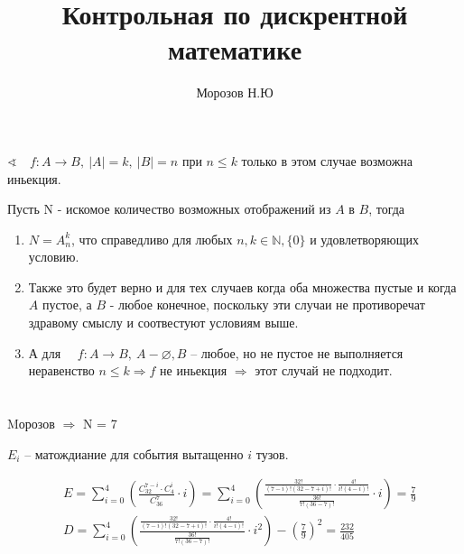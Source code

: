 

\begin{titlepage}
    \title{Контрольная по дискрентной математике}
    \author{Морозов Н.Ю}
    \date{}
\end{titlepage}



    \maketitle  
        
    \section{}

    $ \sphericalangle \quad f : A \longrightarrow B,\ |A| = k,\ |B| = n$ при $ n \leqslant  k $ только в этом случае возможна иньекция. 

    \noindent Пусть N - искомое количество возможных отображений из $A$ в $B$, тогда

    \begin{enumerate}
        \item $N = A^k_n$, что справедливо для любых $n, k \in \mathbb{N}, \{0\} $ и удовлетворяющих условию.
        \item Также это будет верно и для тех случаев когда оба множества пустые и когда $A$ пустое, а $B$ - любое
        конечное, поскольку эти случаи не противоречат здравому смыслу и соотвестуют условиям выше.
        \item А для $ \quad f : A \longrightarrow B, \ A - \varnothing, B$ -- любое, но не пустое не выполняется неравенство 
        $ n \leqslant  k \Longrightarrow f$ не иньекция $\Longrightarrow$ этот случай не подходит.
    \end{enumerate}

    \section{}

    Mорозов $ \Longrightarrow $ N = 7

   \noindent $E_i$ -- матождиание для события вытащенно $i$ тузов.

   

    \begin{align}
        &E = \sum_{i = 0}^{4} \left(\frac{C^{7-i}_{32} \cdot C^{i}_{4}}{C^7_{36}} \cdot i \right)  =
        \sum_{i=0}^{4} \left( \frac{\frac{32!}{(7-i)!(32-7+i)!} \cdot \frac{4!}{i!(4-i)!}}{\frac{36!}{7!(36 - 7)!}} \cdot i\right)  = \frac{7}{9}\\
        &D = \sum_{i=0}^{4} \left( \frac{\frac{32!}{(7-i)!(32-7+i)!} \cdot \frac{4!}{i!(4-i)!}}{\frac{36!}{7!(36 - 7)!}} \cdot i^2\right) - \left(\frac{7}{9}\right)^2 = \frac{232}{405}
    \end{align}

